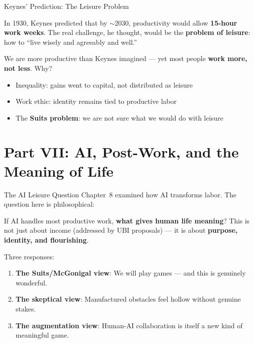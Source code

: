 \documentclass[aspectratio=169,11pt]{beamer}
\begin{document}
\begin{frame}[t]{Keynes' Prediction: The Leisure Problem}
\begin{conceptbox}
\footnotesize
In 1930, Keynes predicted that by $\sim$2030, productivity would allow \textbf{15-hour work weeks}. The real challenge, he thought, would be the \textbf{problem of leisure}: how to ``live wisely and agreeably and well.''
\end{conceptbox}

\vspace{0.15cm}
\footnotesize We are more productive than Keynes imagined --- yet most people \textbf{work more, not less}. Why?
\begin{itemize}
    \item Inequality: gains went to capital, not distributed as leisure
    \item Work ethic: identity remains tied to productive labor
    \item The \textbf{Suits problem}: we are not sure what we would do with leisure
\end{itemize}
\end{frame}

\section{Part VII: AI, Post-Work, and the Meaning of Life}

\begin{frame}[t]{The AI Leisure Question}
\footnotesize
Chapter~8 examined how AI transforms labor. The question here is philosophical:

\begin{conceptbox}
\footnotesize
If AI handles most productive work, \textbf{what gives human life meaning}? This is not just about income (addressed by UBI proposals) --- it is about \textbf{purpose, identity, and flourishing}.
\end{conceptbox}

\vspace{0.12cm}
Three responses:
\begin{enumerate}
    \item \textbf{The Suits/McGonigal view}: We will play games --- and this is genuinely wonderful.
    \item \textbf{The skeptical view}: Manufactured obstacles feel hollow without genuine stakes.
    \item \textbf{The augmentation view}: Human-AI collaboration is itself a new kind of meaningful game.
\end{enumerate}
\end{frame}
\end{document}
